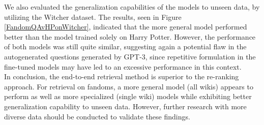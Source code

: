\documentclass[11pt]{article}
\begin{document}
We also evaluated the generalization capabilities of the models to unseen data, by utilizing the Witcher dataset. The results, seen in Figure \ref{FandomQAvHPonWitcher}, indicated that the more general model performed better than the model trained solely on Harry Potter. However, the performance of both models was still quite similar, suggesting again a potential flaw in the autogenerated questions generated by GPT-3, since repetitive formulation in the fine-tuned models may have led to an excessive performance in this context. \\
In conclusion, the end-to-end retrieval method is superior to the re-ranking approach. For retrieval on fandoms, a more general model (all wikis) appears to perform as well as more specialized (single wiki) models while exhibiting better generalization capability to unseen data. However, further research with more diverse data should be conducted to validate these findings.
\end{document}

